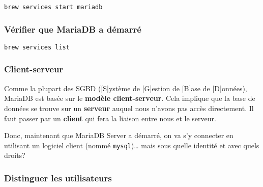 \documentclass[11pt]{article}
\begin{document}
\begin{verbatim}
brew services start mariadb
\end{verbatim}

\subsubsection{Vérifier que MariaDB a démarré}
\label{sec:org69ed688}

\begin{verbatim}
brew services list
\end{verbatim}

\subsubsection{Client-serveur}
\label{sec:org3de0c88}

Comme la plupart des SGBD ([S]ystème de [G]estion de [B]ase de [D]onnées), MariaDB est basée sur le \textbf{modèle client-serveur}. Cela implique que la base de données se trouve sur un \textbf{serveur} auquel nous n'avons pas accès directement. Il faut passer par un \textbf{client} qui fera la liaison entre nous et le serveur.

Donc, maintenant que  MariaDB Server a démarré, on va s'y connecter en utilisant un logiciel client (nommé \texttt{mysql})\ldots{} mais sous quelle identité et avec quels droits?

\subsubsection{Distinguer les utilisateurs}
\label{sec:org2641309}
\end{document}
